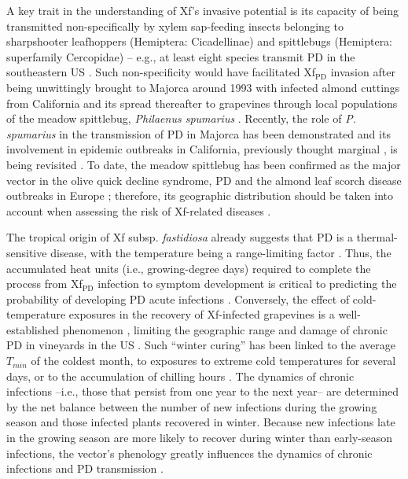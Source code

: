A key trait in the understanding of Xf's invasive potential is its capacity of
being transmitted non-specifically by xylem sap-feeding insects belonging to
sharpshooter leafhoppers (Hemiptera: Cicadellinae) and spittlebugs (Hemiptera:
superfamily Cercopidae) \cite{Almeida2016, Cornara2018} -- e.g., at least eight
species transmit PD in the southeastern US \cite{Overall2017}. Such
non-specificity would have facilitated Xf$_{\textrm{PD}}$ invasion after being
unwittingly brought to Majorca around 1993 with infected almond cuttings from
California and its spread thereafter to grapevines through local populations of
the meadow spittlebug, \textit{Philaenus spumarius} \cite{Moralejo2020}.
Recently, the role of \textit{P. spumarius} in the transmission of PD in
Majorca has been demonstrated \cite{Moralejo2019} and its involvement in
epidemic outbreaks in California, previously thought marginal \cite{Redak2004,
    Severin1950}, is being revisited \cite{Cornara2016, Beal2021}. To date, the
meadow spittlebug has been confirmed as the major vector in the olive quick
decline syndrome, PD and the almond leaf scorch disease outbreaks in Europe
\cite{Cornara2018, Cornara2019,Moralejo2019, Moralejo2020}; therefore, its
geographic distribution should be taken into account when assessing the risk of
Xf-related diseases \cite{Godefroid2021}.

The tropical origin of Xf subsp. \textit{fastidiosa} already suggests that PD
is a thermal-sensitive disease, with the temperature being a range-limiting
factor \cite{Castillo2021, Purcell2013}. Thus, the accumulated heat units
(i.e., growing-degree days) required to complete the process from
Xf$_{\textrm{PD}}$ infection to symptom development is critical to predicting
the probability of developing PD acute infections \cite{Feil2001}. Conversely,
the effect of cold-temperature exposures in the recovery of Xf-infected
grapevines is a well-established phenomenon \cite{Feil2001, Lieth2011,
    Purcell1980}, limiting the geographic range and damage of chronic PD in
vineyards in the US \cite{Hopkins2002}. Such ``winter curing'' has been linked
to the average $T_{min}$ of the coldest month, to exposures to extreme cold
temperatures for several days, or to the accumulation of chilling hours
\cite{Anas2008}. The dynamics of chronic infections --i.e., those that persist
from one year to the next year-- are determined by the net balance between the
number of new infections during the growing season and those infected plants
recovered in winter. Because new infections late in the growing season are more
likely to recover during winter than early-season infections, the vector's
phenology greatly influences the dynamics of chronic infections and PD
transmission  \cite{Feil2003,Redak2004,Gruber2012,Daugherty2019}.

